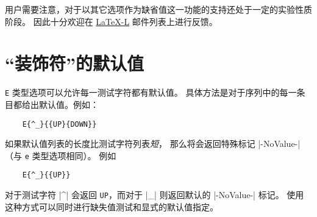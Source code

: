 \documentclass{l3doc}
\begin{document}
%
用户需要注意，对于以其它选项作为缺省值这一功能的支持还处于一定的实验性质阶段。
因此十分欢迎在 \href{http://news.gmane.org/group/gmane.comp.tex.latex.latex3}{LaTeX-L} 邮件列表上进行反馈。

%
\section{“装饰符”的默认值}
\label{sec:embellishment}

\texttt{E} 类型选项可以允许每一测试字符都有默认值。
具体方法是对于序列中的每一条目都给出默认值。例如：
\begin{verbatim}
    E{^_}{{UP}{DOWN}}
\end{verbatim}
%
如果默认值列表的长度比测试字符列表\emph{短}，
那么将会返回特殊标记 |-NoValue-|（与 \texttt{e} 类型选项相同）。
例如
\begin{verbatim}
    E{^_}{{UP}}
\end{verbatim}
对于测试字符 |^| 会返回 \texttt{UP}，而对于 |_| 则返回默认的 |-NoValue-| 标记。
使用这种方式可以同时进行缺失值测试和显式的默认值指定。

%
\end{document}
